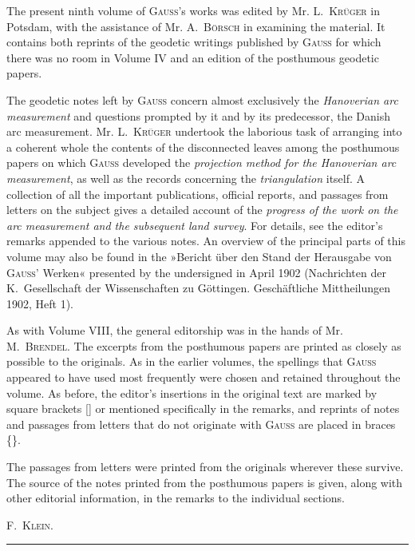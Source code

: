 The present ninth volume of \textsc{Gauss}'s works was edited by Mr. L.~\textsc{Krüger} in Potsdam, with the assistance of Mr. A.~\textsc{Börsch} in examining the material. It contains both reprints of the geodetic writings published by \textsc{Gauss} for which there was no room in Volume IV and an edition of the posthumous geodetic papers.

The geodetic notes left by \textsc{Gauss} concern almost exclusively the \textit{Hanoverian arc measurement} and questions prompted by it and by its predecessor, the Danish arc measurement. Mr. L.~\textsc{Krüger} undertook the laborious task of arranging into a coherent whole the contents of the disconnected leaves among the posthumous papers on which \textsc{Gauss} developed the \textit{projection method for the Hanoverian arc measurement}, as well as the records concerning the \textit{triangulation} itself. A collection of all the important publications, official reports, and passages from letters on the subject gives a detailed account of the \textit{progress of the work on the arc measurement and the subsequent land survey}. For details, see the editor's remarks appended to the various notes. An overview of the principal parts of this volume may also be found in the »Bericht über den Stand der Herausgabe von \textsc{Gauss}' Werken« presented by the undersigned in April 1902 (Nachrichten der K.~Gesellschaft der Wissenschaften zu Göttingen. Geschäftliche Mittheilungen 1902, Heft 1).

As with Volume VIII, the general editorship was in the hands of Mr. M.~\textsc{Brendel}. The excerpts from the posthumous papers are printed as closely as possible to the originals. As in the earlier volumes, the spellings that \textsc{Gauss} appeared to have used most frequently were chosen and retained throughout the volume. As before, the editor's insertions in the original text are marked by square brackets [] or mentioned specifically in the remarks, and reprints of notes and passages from letters that do not originate with \textsc{Gauss} are placed in braces \{\}.

The passages from letters were printed from the originals wherever these survive. The source of the notes printed from the posthumous papers is given, along with other editorial information, in the remarks to the individual sections.\par
\hfill F.~\textsc{Klein.}\hspace*{\parindent}\par

\begin{center}\rule{4cm}{.4pt}\end{center}
\noindent{}\par

